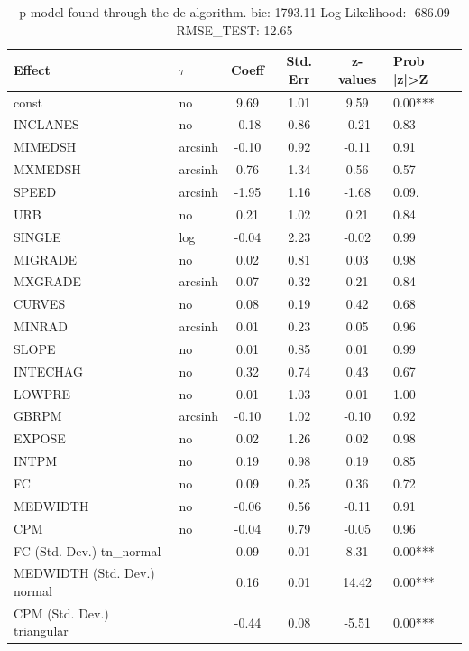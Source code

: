 \begin{table}
	\caption{p model found through the de algorithm. bic: 1793.11 Log-Likelihood: -686.09 RMSE_TEST: 12.65}
	\begin{center}
		\begin{tabular}{|l|l|c|c|c|l|}
			\hline
			Effect & $\tau$ & Coeff & Std. Err & z-values & Prob |z|>Z \\
			\hline
			const & no & 9.69 & 1.01 & 9.59 & 0.00*** \\
			\hline
			INCLANES & no & -0.18 & 0.86 & -0.21 & 0.83 \\
			\hline
			MIMEDSH & arcsinh & -0.10 & 0.92 & -0.11 & 0.91 \\
			\hline
			MXMEDSH & arcsinh & 0.76 & 1.34 & 0.56 & 0.57 \\
			\hline
			SPEED & arcsinh & -1.95 & 1.16 & -1.68 & 0.09. \\
			\hline
			URB & no & 0.21 & 1.02 & 0.21 & 0.84 \\
			\hline
			SINGLE & log & -0.04 & 2.23 & -0.02 & 0.99 \\
			\hline
			MIGRADE & no & 0.02 & 0.81 & 0.03 & 0.98 \\
			\hline
			MXGRADE & arcsinh & 0.07 & 0.32 & 0.21 & 0.84 \\
			\hline
			CURVES & no & 0.08 & 0.19 & 0.42 & 0.68 \\
			\hline
			MINRAD & arcsinh & 0.01 & 0.23 & 0.05 & 0.96 \\
			\hline
			SLOPE & no & 0.01 & 0.85 & 0.01 & 0.99 \\
			\hline
			INTECHAG & no & 0.32 & 0.74 & 0.43 & 0.67 \\
			\hline
			LOWPRE & no & 0.01 & 1.03 & 0.01 & 1.00 \\
			\hline
			GBRPM & arcsinh & -0.10 & 1.02 & -0.10 & 0.92 \\
			\hline
			EXPOSE & no & 0.02 & 1.26 & 0.02 & 0.98 \\
			\hline
			INTPM & no & 0.19 & 0.98 & 0.19 & 0.85 \\
			\hline
			FC & no & 0.09 & 0.25 & 0.36 & 0.72 \\
			\hline
			MEDWIDTH & no & -0.06 & 0.56 & -0.11 & 0.91 \\
			\hline
			CPM & no & -0.04 & 0.79 & -0.05 & 0.96 \\
			\hline
			FC (Std. Dev.) tn_normal &  & 0.09 & 0.01 & 8.31 & 0.00*** \\
			\hline
			MEDWIDTH (Std. Dev.) normal &  & 0.16 & 0.01 & 14.42 & 0.00*** \\
			\hline
			CPM (Std. Dev.) triangular &  & -0.44 & 0.08 & -5.51 & 0.00*** \\
			\hline
		\end{tabular}
	\end{center}
\end{table}